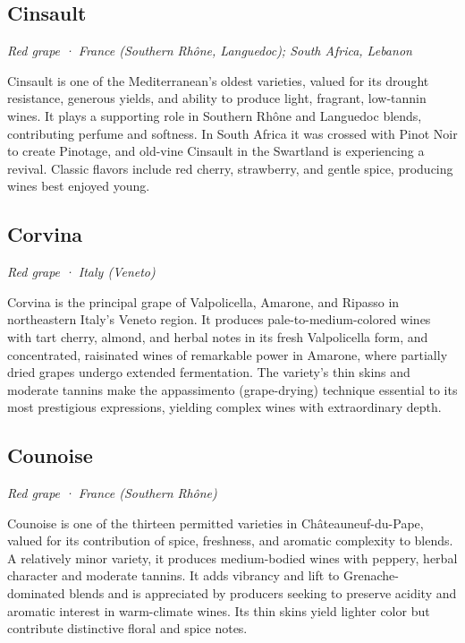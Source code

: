 \subsection*{Cinsault}
\textit{Red grape · France (Southern Rhône, Languedoc); South Africa, Lebanon}\par\smallskip

Cinsault is one of the Mediterranean’s oldest varieties, valued for its drought resistance, generous yields, and ability to produce light, fragrant, low-tannin wines. It plays a supporting role in Southern Rhône and Languedoc blends, contributing perfume and softness. In South Africa it was crossed with Pinot Noir to create Pinotage, and old-vine Cinsault in the Swartland is experiencing a revival. Classic flavors include red cherry, strawberry, and gentle spice, producing wines best enjoyed young.

\subsection*{Corvina}
\textit{Red grape · Italy (Veneto)}\par\smallskip

Corvina is the principal grape of Valpolicella, Amarone, and Ripasso in northeastern Italy’s Veneto region. It produces pale-to-medium-colored wines with tart cherry, almond, and herbal notes in its fresh Valpolicella form, and concentrated, raisinated wines of remarkable power in Amarone, where partially dried grapes undergo extended fermentation. The variety’s thin skins and moderate tannins make the appassimento (grape-drying) technique essential to its most prestigious expressions, yielding complex wines with extraordinary depth.

\subsection*{Counoise}
\textit{Red grape · France (Southern Rhône)}\par\smallskip

Counoise is one of the thirteen permitted varieties in Châteauneuf-du-Pape, valued for its contribution of spice, freshness, and aromatic complexity to blends. A relatively minor variety, it produces medium-bodied wines with peppery, herbal character and moderate tannins. It adds vibrancy and lift to Grenache- dominated blends and is appreciated by producers seeking to preserve acidity and aromatic interest in warm-climate wines. Its thin skins yield lighter color but contribute distinctive floral and spice notes.

